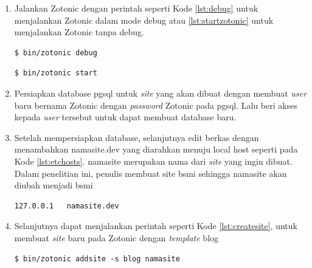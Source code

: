 \begin{enumerate}
	\item Jalankan Zotonic dengan perintah seperti Kode \ref{lst:debug} untuk menjalankan Zotonic dalam mode debug atau \ref{lst:startzotonic} untuk menjalankan Zotonic tanpa debug.
	
	\begin{minipage}{\linewidth}
		\begin{lstlisting}[caption={Perintah untuk menjalankan Zotonic pada mode \textit{debug}},label={lst:debug}]
		$ bin/zotonic debug
		\end{lstlisting}
	\end{minipage}

	\begin{minipage}{\linewidth}
		\begin{lstlisting}[caption={Perintah untuk menjalankan Zotonic tanpa mode \textit{debug}},label={lst:startzotonic}]
		$ bin/zotonic start
		\end{lstlisting}
	\end{minipage}

	\item Persiapkan database pgsql untuk \textit{site} yang akan dibuat dengan membuat \textit{user} baru bernama Zotonic dengan \textit{password} Zotonic pada pgsql. Lalu beri akses kepada \textit{user} tersebut untuk dapat membuat database baru.
	
	\item Setelah mempersiapkan database, selanjutnya edit berkas  dengan menambahkan namasite.dev yang diarahkan menuju local host seperti pada Kode \ref{lst:etchosts}. namasite merupakan nama dari \textit{site} yang ingin dibuat. Dalam penelitian ini, penulis membuat site bsmi sehingga namasite akan diubah menjadi bsmi
	\begin{minipage}{\linewidth}
		\begin{lstlisting}[caption={Configurasi berkas /etc/hosts},label={lst:etchosts}]
		127.0.0.1   namasite.dev
		\end{lstlisting}
	\end{minipage}

	\item Selanjutnya dapat menjalankan perintah seperti Kode \ref{lst:createsite}, untuk membuat \textit{site} baru pada Zotonic dengan \textit{template} blog
	\begin{minipage}{\linewidth}
		\begin{lstlisting}[caption={Perintah untuk membuat \textit{site} baru pada Zotonic},label={lst:createsite}]
		$ bin/zotonic addsite -s blog namasite
		\end{lstlisting}
	\end{minipage}


\end{enumerate}
